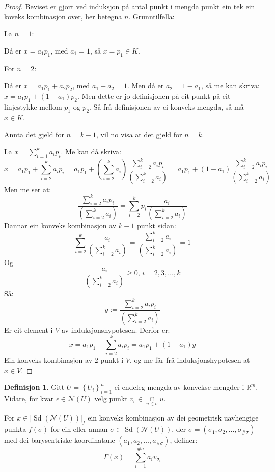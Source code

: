 \documentclass[a4paper, titlepage, 12pt, norsk]{article}
\theoremstyle{plain}
\theoremstyle{definition}
\newtheorem{definition}[theorem]{Definisjon}
\newcommand{\Rb}{\mathbb{R}}
\newcommand{\Nc}{\mathcal{N}}
\newcommand{\intersect}{ \mathop{\cap}\limits } %
\newcommand{\gr}[1]{ \lvert #1 \rvert } %
\newcommand{\set}[1]{ \left \{ #1 \right \} } %
\newcommand{\tuple}[1]{ \left( #1 \right) } %
\DeclareMathOperator{\Sd}{Sd}
\begin{document}
\begin{proof}
	Beviset er gjort ved induksjon på antal punkt i mengda punkt ein tek ein koveks kombinasjon over, her betegna \( n \).
	Grunntilfella:

	La \( n = 1 \):
	
	Då er \( x = a_1 p_1 \), med \( a_1 = 1 \), så \( x = p_1 \in K \).
	
	For \( n = 2 \):

	Då er \( x = a_1 p_1 + a_2 p_2 \), med \( a_1 + a_2 = 1 \). Men då er \( a_2 = 1 - a_1 \), så me kan skriva: \( x = a_1 p_1 + (1-a_1) p_2 \). Men dette er jo definisjonen på eit punkt på eit linjestykke mellom \( p_1 \) og \( p_2 \). Så frå definisjonen av ei konveks mengda, så må \( x \in K \).

	Annta det gjeld for \( n = k-1 \), vil no visa at det gjeld for \( n = k \).

	La \( x = \sum_{i=1}^k a_i p_i \). Me kan då skriva:
	\[ 
		x = a_1 p_1 + \sum_{i=2}^k a_i p_i = a_1 p_1 + (\sum_{i=2}^k a_i) \frac{\sum_{i=2}^k a_i p_i}{(\sum_{i=2}^k a_i)} = a_1 p_1 + (1-a_1) \frac{\sum_{i=2}^k a_i p_i}{(\sum_{i=2}^k a_i)}
	\]
	Men me ser at:
	\[
		\frac{\sum_{i=2}^k a_i p_i}{(\sum_{i=2}^k a_i)} = \sum_{i=2}^k p_i\frac{a_i}{(\sum_{i=2}^k a_i)}
	\]
	Dannar ein konveks kombinasjon av \( k-1 \) punkt sidan:
	\[
		\sum_{i=2}^k \frac{a_i}{(\sum_{i=2}^k a_i)} = \frac{\sum_{i=2}^k a_i}{(\sum_{i=2}^k a_i)} = 1
	\]
	Og
	\[
		\frac{a_i}{(\sum_{i=2}^k a_i)} \geq 0, \, i=2,3,\dots,k
	\]
	Så:
	\[
		y := \frac{\sum_{i=2}^k a_i p_i}{(\sum_{i=2}^k a_i)}
	\]
	Er eit element i \( V \) av induksjonshypotesen. Derfor er:
	\[
		x = a_1 p_1 + \sum_{i=2}^k a_i p_i = a_1 p_1 + (1-a_1) y
	\]
	Ein konveks kombinasjon av \( 2 \) punkt i \( V \), og me får frå induksjonshypotesen at \( x \in V \).
\end{proof}

\begin{definition} \label{thm:Gamma} %
	Gitt \( U = \set{U_i}_{i=1}^n \) ei endeleg mengda av konvekse mengder i \( \Rb^m \). Vidare, for kvar \( \epsilon \in \Nc(U) \) velg punkt \( v_\epsilon \in \intersect_{u \in \sigma} u \).

	For \( x \in \gr{\Sd(\Nc(U))}_f \) ein konveks kombinasjon av dei geometrisk uavhengige punkta \( f(\sigma) \) for ein eller annan \( \sigma \in \Sd(\Nc(U)) \), der \( \sigma = \tuple{\sigma_1, \sigma_2, \dots, \sigma_{\#\sigma}} \) med dei barysentriske koordinatane \( \tuple{a_1, a_2, \dots, a_{\#\sigma}} \), definer:
	\[
		\Gamma(x) = \sum_{i=1}^{\#\sigma} a_i v_{\sigma_i}
	\]
\end{definition}
\end{document}
